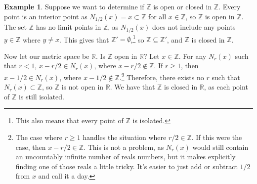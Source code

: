 \documentclass{article}
\newcommand{\R}{\mathbb{R}}
\newcommand{\Z}{\mathbb{Z}}
\theoremstyle{definition}
\newtheorem{example}{Example}[section]
\begin{document}
\begin{example}
	Suppose we want to determine if $ \Z $ is open or closed in $ \Z $. Every point is an interior point as $ N_{1/2}(x)={x}\subset\Z $ for all $ x\in\Z $, so $ \Z $ is open in $ \Z $. The set $ \Z $ has no limit points in $ \Z $, as $ N_{1/2}(x) $ does not include any points $ y\in\Z $ where $ y\neq x $. This gives that $ \Z'=\emptyset $,\footnote{This also means that every point of $ \Z $ is isolated.} so $ \Z\subseteq \Z' $, and $ \Z $ is closed in $ \Z $.
	
	 Now let our metric space be $ \R $. Is $ \Z $ open in $ \R $? Let $ x\in\Z $. For any $ N_r(x) $ such that $ r<1 $, $ x-r/2\in N_r(x) $, where $ x-r/2\notin\Z $. If $ r\ge 1 $, then $ x-1/2\in N_r(x) $, where $ x-1/2\notin\Z $.\footnote{The case where $ r\ge 1 $ handles the situation where $ r/2\in\Z $. If this were the case, then $ x-r/2\in\Z $. This is not a problem, as $ N_r(x) $ would still contain an uncountably infinite number of reals numbers, but it makes explicitly finding one of those reals a little tricky. It's easier to just add or subtract $ 1/2 $ from $ x $ and call it a day.} Therefore, there exists no $ r $ such that $ N_r(x)\subset \Z $, so $ \Z $ is not open in $ \R $. We have that $ \Z $ is closed in $ \R $, as each point of $ \Z $ is still isolated.  
\end{example}
\end{document}
